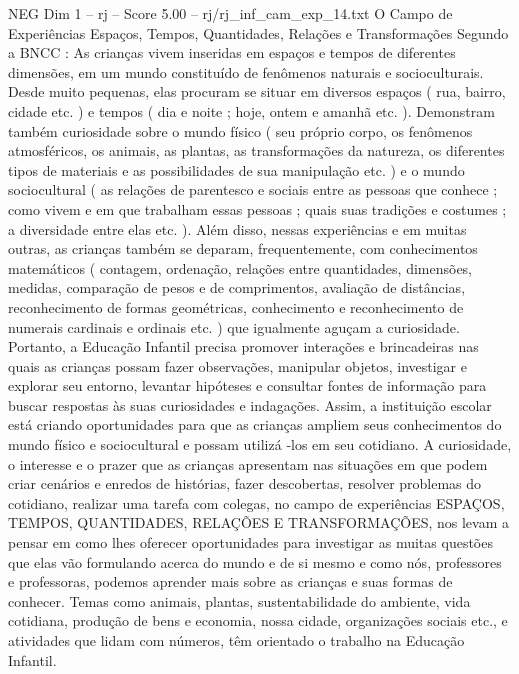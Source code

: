 \begin{textsample}{NEG Dim 1 – rj – Score 5.00 – rj/rj\_inf\_cam\_exp\_14.txt}  \label{ex:f1_neg_011}
O Campo de Experiências Espaços, Tempos, Quantidades, Relações e Transformações Segundo a BNCC : As crianças vivem inseridas em espaços e tempos de diferentes dimensões, em um mundo constituído de fenômenos naturais e socioculturais.
Desde muito pequenas, elas procuram se situar em diversos espaços ( rua, bairro, cidade etc. ) e tempos ( dia e noite ; hoje, ontem e amanhã etc. ).
Demonstram também curiosidade sobre o mundo físico ( seu próprio corpo, os fenômenos atmosféricos, os animais, as plantas, as transformações da natureza, os diferentes tipos de materiais e as possibilidades de sua manipulação etc. ) e o mundo sociocultural ( as relações de parentesco e sociais entre as pessoas que conhece ; como vivem e em que trabalham essas pessoas ; quais suas tradições e costumes ; a diversidade entre elas etc. ).
Além disso, nessas experiências e em muitas outras, as crianças também se deparam, frequentemente, com conhecimentos matemáticos ( contagem, ordenação, relações entre quantidades, dimensões, medidas, comparação de pesos e de comprimentos, avaliação de distâncias, reconhecimento de formas geométricas, conhecimento e reconhecimento de numerais cardinais e ordinais etc. ) que igualmente aguçam a curiosidade.
Portanto, a Educação Infantil precisa promover interações e brincadeiras nas quais as crianças possam fazer observações, manipular objetos, investigar e explorar seu entorno, levantar hipóteses e consultar fontes de informação para buscar respostas às suas curiosidades e indagações.
Assim, a instituição escolar está criando oportunidades para que as crianças ampliem seus conhecimentos do mundo físico e sociocultural e possam utilizá -los em seu cotidiano.
A curiosidade, o interesse e o prazer que as crianças apresentam nas situações em que podem criar cenários e enredos de histórias, fazer descobertas, resolver problemas do cotidiano, realizar uma tarefa com colegas, no campo de experiências ESPAÇOS, TEMPOS, QUANTIDADES, RELAÇÕES E TRANSFORMAÇÕES, nos levam a pensar em como lhes oferecer oportunidades para investigar as muitas questões que elas vão formulando acerca do mundo e de si mesmo e como nós, professores e professoras, podemos aprender mais sobre as crianças e suas formas de conhecer.
Temas como animais, plantas, sustentabilidade do ambiente, vida cotidiana, produção de bens e economia, nossa cidade, organizações sociais etc., e atividades que lidam com números, têm orientado o trabalho na Educação Infantil.

\end{textsample}
